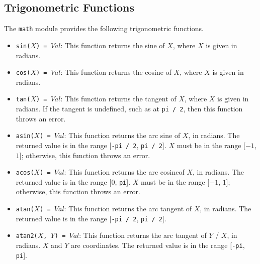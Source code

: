 \subsection{Trigonometric Functions}
The \texttt{math} module provides the following trigonometric functions.
\begin{itemize}
\item \texttt{sin($X$) = $Val$}: This function returns the sine of $X$, where $X$ is given in radians.
\item \texttt{cos($X$) = $Val$}: This function returns the cosine of $X$, where $X$ is given in radians.
\item \texttt{tan($X$) = $Val$}: This function returns the tangent of $X$, where $X$ is given in radians.  If the tangent is undefined, such as at \texttt{pi / 2}, then this function throws an error.
\item \texttt{asin($X$) = $Val$}: This function returns the arc sine of $X$, in radians.  The returned value is in the range [\texttt{-pi / 2}, \texttt{pi / 2}].  $X$ must be in the range [$-1$, $1$]; otherwise, this function throws an error.
\item \texttt{acos($X$) = $Val$}: This function returns the arc cosineof $X$, in radians.  The returned value is in the range [$0$, \texttt{pi}].  $X$ must be in the range [$-1$, $1$]; otherwise, this function throws an error.
\item \texttt{atan($X$) = $Val$}: This function returns the arc tangent of $X$, in radians.  The returned value is in the range [\texttt{-pi / 2}, \texttt{pi / 2}].
\item \texttt{atan2($X$, $Y$) = $Val$}: This function returns the arc tangent of $Y$ / $X$, in radians.  $X$ and $Y$ are coordinates.  The returned value is in the range [\texttt{-pi}, \texttt{pi}].  
\end{itemize}

